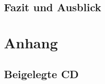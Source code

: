 \documentclass[
  a4paper,					    %
  twoside,
  DIV=calc,     				%
  bibliography=totoc,
  cleardoublepage=empty,
  ngerman,     					%
  final       					%
]{scrbook}
\begin{document}
\paragraph{}








\chapter{Fazit und Ausblick}
\label{sec:FazitAusblick}














\appendix
\part*{Anhang}










\backmatter



\chapter{Beigelegte CD}
\label{sec:BeigelegteCD}
\end{document}
